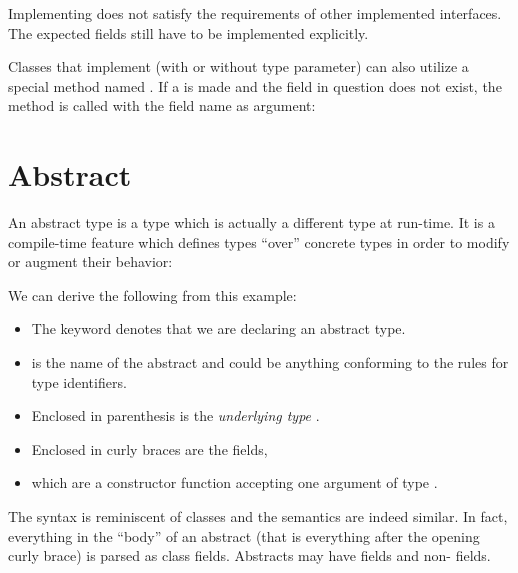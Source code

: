 {

Implementing  does not satisfy the requirements of other implemented interfaces. The expected fields still have to be implemented explicitly.

Classes that implement  (with or without type parameter) can also utilize a special method named . If a  is made and the field in question does not exist, the  method is called with the field name as argument:




\section{Abstract}
\label{types-abstract}

An abstract type is a type which is actually a different type at run-time. It is a compile-time feature which defines types ``over'' concrete types in order to modify or augment their behavior:

We can derive the following from this example:

\begin{itemize}
	\item The keyword  denotes that we are declaring an abstract type.
	\item {} is the name of the abstract and could be anything conforming to the rules for type identifiers.
	\item Enclosed in parenthesis \expr{()} is the \emph{underlying type} .
	\item Enclosed in curly braces \expr{$\left\{\right\}$} are the fields,
	\item which are a constructor function  accepting one argument  of type .
\end{itemize}


The syntax is reminiscent of classes and the semantics are indeed similar. In fact, everything in the ``body'' of an abstract (that is everything after the opening curly brace) is parsed as class fields. Abstracts may have  fields and non-  fields.

}
